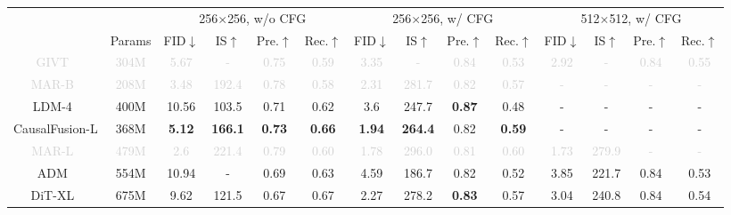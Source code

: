 \begin{table}[t]
\footnotesize
\begin{tabular}{c|c|cccc|cccc|cccc}
& & \multicolumn{4}{c}{256$\times$256, w/o CFG} & \multicolumn{4}{c}{256$\times$256, w/ CFG} & \multicolumn{4}{c}{512$\times$512, w/ CFG}\\
& Params & FID$\downarrow$ & IS$\uparrow$ & Pre.$\uparrow$ & Rec.$\uparrow$ & FID$\downarrow$ & IS$\uparrow$ & Pre.$\uparrow$ & Rec.$\uparrow$ & FID$\downarrow$ & IS$\uparrow$ & Pre.$\uparrow$ & Rec.$\uparrow$ \\
\shline
\textcolor{lightgray}{GIVT~\cite{tschannen2025givt}} & \textcolor{lightgray}{304M} & \textcolor{lightgray}{5.67} & \textcolor{lightgray}{-} & \textcolor{lightgray}{0.75} & \textcolor{lightgray}{0.59} & \textcolor{lightgray}{3.35} & \textcolor{lightgray}{-} & \textcolor{lightgray}{0.84} & \textcolor{lightgray}{0.53} & \textcolor{lightgray}{2.92} & \textcolor{lightgray}{-} & \textcolor{lightgray}{0.84} & \textcolor{lightgray}{0.55} \\
\textcolor{lightgray}{MAR-B~\cite{mar}} & \textcolor{lightgray}{208M} & \textcolor{lightgray}{3.48} & \textcolor{lightgray}{192.4} & \textcolor{lightgray}{0.78} & \textcolor{lightgray}{0.58} & \textcolor{lightgray}{2.31} & \textcolor{lightgray}{281.7} & \textcolor{lightgray}{0.82} & \textcolor{lightgray}{0.57} & \textcolor{lightgray}{-} & \textcolor{lightgray}{-} & \textcolor{lightgray}{-} & \textcolor{lightgray}{-} \\
LDM-4~\cite{rombach2022high} & 400M & 10.56 & 103.5 & 0.71 & 0.62 & 3.6 & 247.7 & \textbf{0.87} & 0.48 & - & - & - & - \\
CausalFusion-L & 368M & \textbf{5.12} & \textbf{166.1} & \textbf{0.73} & \textbf{0.66} & \textbf{1.94} & \textbf{264.4} & 0.82 & \textbf{0.59} & - & - & - & - \\
\hline
\textcolor{lightgray}{MAR-L~\cite{mar}} & \textcolor{lightgray}{479M} & \textcolor{lightgray}{2.6} & \textcolor{lightgray}{221.4} & \textcolor{lightgray}{0.79} & \textcolor{lightgray}{0.60} & \textcolor{lightgray}{1.78} & \textcolor{lightgray}{296.0} & \textcolor{lightgray}{0.81} & \textcolor{lightgray}{0.60} & \textcolor{lightgray}{1.73} & \textcolor{lightgray}{279.9} & \textcolor{lightgray}{-} & \textcolor{lightgray}{-} \\
ADM~\cite{adm} & 554M & 10.94 & - & 0.69 & 0.63 & 4.59 & 186.7 & 0.82 & 0.52 & 3.85 & 221.7 & {0.84} & 0.53 \\
DiT-XL~\cite{dit} & 675M & 9.62 & 121.5 & 0.67 & 0.67 & 2.27 & 278.2 & \textbf{0.83} & 0.57 & 3.04 & 240.8 & {0.84} & 0.54 \\

\end{tabular}
\end{table}
